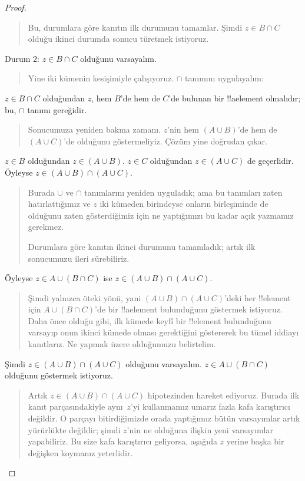 \documentclass[../../../include/open-logic-section]{subfiles}
\begin{document}
\begin{proof}
\begin{quote}
Bu, durumlara göre kanıtın ilk durumunu tamamlar. Şimdi $z \in B \cap
C$ olduğu ikinci durumda sonucu türetmek istiyoruz.
\end{quote}
Durum 2: $z \in B \cap C$ olduğunu varsayalım.
\begin{quote}
Yine iki kümenin kesişimiyle çalışıyoruz. $\cap$ tanımını uygulayalım:
\end{quote}
$z \in B \cap C$ olduğundan $z$, hem $B$'de hem de $C$'de bulunan bir
!!a{element} olmalıdır; bu, $\cap$ tanımı gereğidir.
\begin{quote}
Sonucumuza yeniden bakma zamanı. $z$'nin hem $(A \cup B)$'de hem de $(A
\cup C)$'de olduğunu göstermeliyiz. Çözüm yine doğrudan çıkar.
\end{quote}
$z \in B$ olduğundan $z \in (A \cup B)$. $z \in C$ olduğundan $z \in
(A \cup C)$ de geçerlidir. Öyleyse $z \in (A \cup B) \cap (A \cup C)$.
\begin{quote}
Burada $\cup$ ve $\cap$ tanımlarını yeniden uyguladık; ama bu tanımları
zaten hatırlattığımız ve $z$ iki kümeden birindeyse onların birleşiminde
de olduğunu zaten gösterdiğimiz için ne yaptığımızı bu kadar açık
yazmamız gerekmez.

Durumlara göre kanıtın ikinci durumunu tamamladık; artık ilk sonucumuzu
ileri sürebiliriz.
\end{quote}
Öyleyse $z \in A \cup (B \cap C)$ ise $z \in (A \cup B) \cap (A \cup C)$.
\begin{quote}
Şimdi yalnızca öteki yönü, yani $(A \cup B) \cap (A \cup C)$'deki her
!!{element} için $A \cup (B \cap C)$'de bir !!a{element} bulunduğunu
göstermek istiyoruz. Daha önce olduğu gibi, ilk kümede keyfî bir
!!{element} bulunduğunu varsayıp onun ikinci kümede olması
gerektiğini göstererek bu tümel iddiayı kanıtlarız. Ne yapmak üzere
olduğumuzu belirtelim.
\end{quote}
Şimdi $z \in (A \cup B) \cap (A \cup C)$ olduğunu varsayalım. $z \in A
\cup (B \cap C)$ olduğunu göstermek istiyoruz.
\begin{quote}
Artık $z \in (A \cup B) \cap (A \cup C)$ hipotezinden hareket ediyoruz.
Burada ilk kanıt parçasındakiyle aynı~$z$'yi kullanmamız umarız fazla
kafa karıştırıcı değildir. O parçayı bitirdiğimizde orada yaptığımız
bütün varsayımlar artık yürürlükte değildir; şimdi $z$'nin ne olduğuna
ilişkin yeni varsayımlar yapabiliriz. Bu size kafa karıştırıcı
geliyorsa, aşağıda $z$ yerine başka bir değişken koymanız yeterlidir.


\end{quote}
\end{proof}
\end{document}
